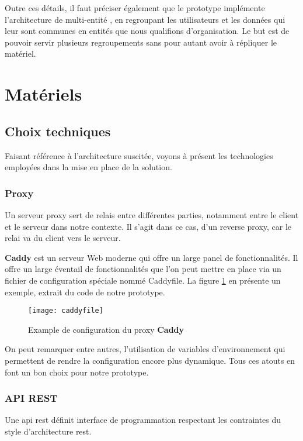 Outre ces détails, il faut préciser également que le prototype implémente l’architecture de multi-entité \cite{multitenancy}, 
en regroupant les utilisateurs et les données qui leur sont communes en entités que nous qualifions d’organisation. 
Le but est de pouvoir servir plusieurs regroupements sans pour autant avoir à répliquer le matériel. 

\section{Matériels}
\subsection{Choix techniques}
Faisant référence à l’architecture suscitée, 
voyons à présent les technologies employées dans la mise en place de la solution.

\subsubsection{Proxy}
Un serveur proxy sert de relais entre différentes parties, notamment entre le client et le serveur dans notre contexte. 
Il s’agit dans ce cas, d’un reverse proxy, car le relai va du client vers le serveur.
 
\textbf{Caddy} est un serveur Web moderne qui offre un large panel de fonctionnalités. 
Il offre un large éventail de fonctionnalités que l’on peut mettre en place via un fichier de configuration spéciale nommé Caddyfile. 
La figure \ref{fig:caddyfile} en présente un exemple, extrait du code de notre prototype.


\begin{figure}[H]
  \centering
  \texttt{[image: caddyfile]}
  \caption{Example de configuration du proxy \textbf{Caddy}}
  \label{fig:caddyfile}
\end{figure}

On peut remarquer entre autres, l’utilisation de variables d’environnement qui permettent de rendre la configuration encore plus dynamique. 
Tous ces atouts en font un bon choix pour notre prototype.

\subsubsection{API REST}

Une \acrshort{api} \acrshort{rest} définit interface de programmation respectant les contraintes du style d’architecture \acrlong{rest}.

